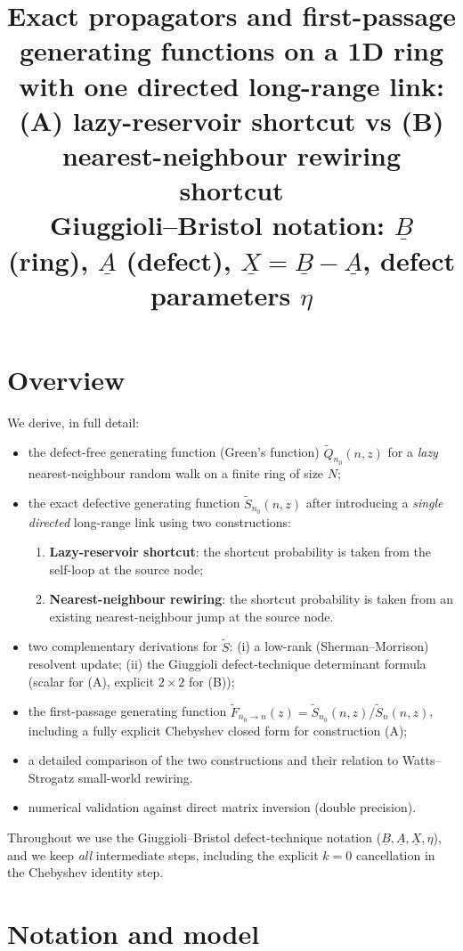 \documentclass[11pt]{article}
\title{Exact propagators and first-passage generating functions on a 1D ring\\
with one directed long-range link: \\
\large (A) lazy-reservoir shortcut \quad vs \quad (B) nearest-neighbour rewiring shortcut\\
\large Giuggioli--Bristol notation: $\underline{B}$ (ring), $\underline{A}$ (defect), $\underline{X}=\underline{B}-\underline{A}$, defect parameters $\eta$}
\author{}
\date{}
\begin{document}
\sloppy
\maketitle

\section*{Overview}
We derive, in full detail:
\begin{itemize}
\item the defect-free generating function (Green's function) $\tilde Q_{n_0}(n,z)$ for a \emph{lazy} nearest-neighbour random walk on a finite ring of size $N$;
\item the exact defective generating function $\tilde S_{n_0}(n,z)$ after introducing a \emph{single directed} long-range link using two constructions:
\begin{enumerate}
\item[(A)] \textbf{Lazy-reservoir shortcut}: the shortcut probability is taken from the self-loop at the source node;
\item[(B)] \textbf{Nearest-neighbour rewiring}: the shortcut probability is taken from an existing nearest-neighbour jump at the source node.
\end{enumerate}
\item two complementary derivations for $\tilde S$: (i) a low-rank (Sherman--Morrison) resolvent update; (ii) the Giuggioli defect-technique determinant formula (scalar for (A), explicit $2\times2$ for (B));
\item the first-passage generating function $\tilde F_{n_0\to n}(z)=\tilde S_{n_0}(n,z)/\tilde S_n(n,z)$, including a fully explicit Chebyshev closed form for construction (A);
\item a detailed comparison of the two constructions and their relation to Watts--Strogatz small-world rewiring.
\item numerical validation against direct matrix inversion (double precision).
\end{itemize}

Throughout we use the Giuggioli--Bristol defect-technique notation ($\underline{B},\underline{A},\underline{X},\eta$), and we keep \emph{all} intermediate steps, including the explicit $k=0$ cancellation in the Chebyshev identity step.

\section{Notation and model}
\end{document}
